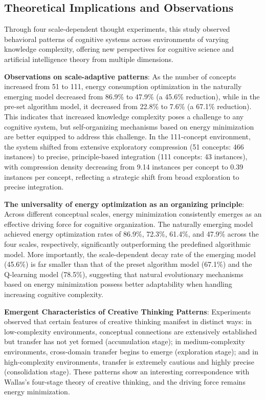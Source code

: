\documentclass[10pt,onecolumn]{article}
\begin{document}
\subsection{Theoretical Implications and Observations}

Through four scale-dependent thought experiments, this study observed behavioral patterns of cognitive systems across environments of varying knowledge complexity, offering new perspectives for cognitive science and artificial intelligence theory from multiple dimensions.

\textbf{Observations on scale-adaptive patterns}: As the number of concepts increased from 51 to 111, energy consumption optimization in the naturally emerging model decreased from 86.9\% to 47.9\% (a 45.6\% reduction), while in the pre-set algorithm model, it decreased from 22.8\% to 7.6\% (a 67.1\% reduction). This indicates that increased knowledge complexity poses a challenge to any cognitive system, but self-organizing mechanisms based on energy minimization are better equipped to address this challenge. In the 111-concept environment, the system shifted from extensive exploratory compression (51 concepts: 466 instances) to precise, principle-based integration (111 concepts: 43 instances), with compression density decreasing from 9.14 instances per concept to 0.39 instances per concept, reflecting a strategic shift from broad exploration to precise integration.

\textbf{The universality of energy optimization as an organizing principle}: Across different conceptual scales, energy minimization consistently emerges as an effective driving force for cognitive organization. The naturally emerging model achieved energy optimization rates of 86.9\%, 72.3\%, 61.4\%, and 47.9\% across the four scales, respectively, significantly outperforming the predefined algorithmic model. More importantly, the scale-dependent decay rate of the emerging model (45.6\%) is far smaller than that of the preset algorithm model (67.1\%) and the Q-learning model (78.5\%), suggesting that natural evolutionary mechanisms based on energy minimization possess better adaptability when handling increasing cognitive complexity.

\textbf{Emergent Characteristics of Creative Thinking Patterns}: Experiments observed that certain features of creative thinking manifest in distinct ways: in low-complexity environments, conceptual connections are extensively established but transfer has not yet formed (accumulation stage); in medium-complexity environments, cross-domain transfer begins to emerge (exploration stage); and in high-complexity environments, transfer is extremely cautious and highly precise (consolidation stage). These patterns show an interesting correspondence with Wallas’s four-stage theory of creative thinking, and the driving force remains energy minimization.
\end{document}
